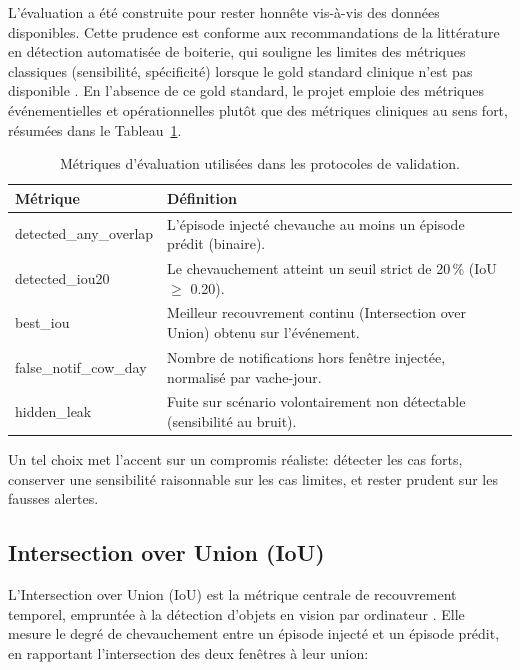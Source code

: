 L'évaluation a été construite pour rester honnête vis-à-vis des données disponibles. Cette
prudence est conforme aux recommandations de la littérature en détection automatisée de
boiterie, qui souligne les limites des métriques classiques (sensibilité, spécificité)
lorsque le gold standard clinique n'est pas disponible \citep{alsaaod2019automatic,
rutten2013invited}. En l'absence de ce gold standard, le projet emploie des métriques
événementielles et opérationnelles plutôt que des métriques cliniques au sens fort,
résumées dans le Tableau~\ref{tab:metriques}.

\begin{table}[H]
    \centering
    \caption{Métriques d'évaluation utilisées dans les protocoles de validation.}
    \label{tab:metriques}
    \small
    \begin{tabular}{>{\ttfamily\raggedright\arraybackslash}p{3.8cm}
                    >{\rmfamily\raggedright\arraybackslash}p{8cm}}
        \toprule
        \textrm{\textbf{Métrique}}             & \textbf{Définition} \\
        \midrule
        detected\_any\_overlap      & L'épisode injecté chevauche au moins un
                                               épisode prédit (binaire). \\
        detected\_iou20             & Le chevauchement atteint un seuil strict
                                               de 20\,\% (IoU $\geq$ 0.20). \\
        best\_iou                   & Meilleur recouvrement continu (Intersection
                                               over Union) obtenu sur l'événement. \\
        false\_notif\_cow\_day      & Nombre de notifications hors fenêtre injectée,
                                               normalisé par vache-jour. \\
        hidden\_leak                & Fuite sur scénario volontairement non
                                               détectable (sensibilité au bruit). \\
        \bottomrule
    \end{tabular}
\end{table}

Un tel choix met l'accent sur un compromis réaliste: détecter les cas forts, conserver une
sensibilité raisonnable sur les cas limites, et rester prudent sur les fausses alertes.

\subsection{Intersection over Union (IoU)}
L'Intersection over Union (IoU) est la métrique centrale de recouvrement temporel, empruntée
à la détection d'objets en vision par ordinateur \citep{everingham2010pascal}. Elle mesure le
degré de chevauchement entre un épisode injecté et un épisode prédit, en rapportant
l'intersection des deux fenêtres à leur union:

